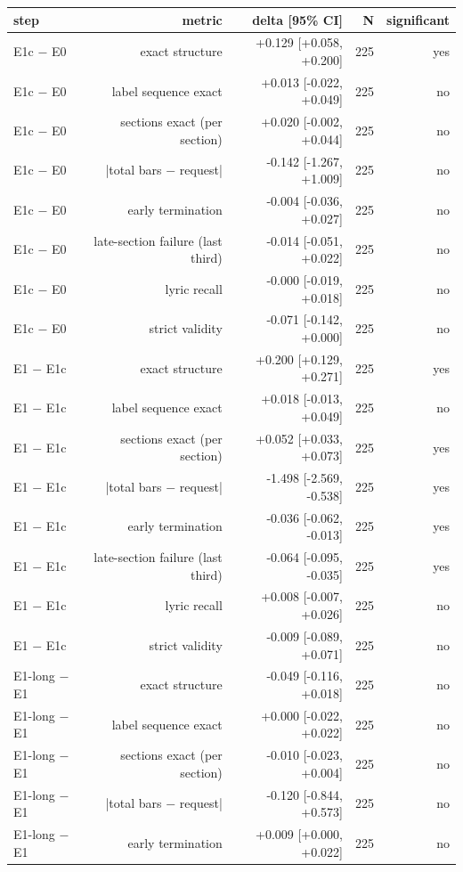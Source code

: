 \begin{table}[t]
\centering
\small
\begin{tabular}{lrrrr}
\toprule
step & metric & delta [95\% CI] & N & significant \\
\midrule
E1c $-$ E0 & exact structure & +0.129 [+0.058, +0.200] & 225 & yes \\
E1c $-$ E0 & label sequence exact & +0.013 [-0.022, +0.049] & 225 & no \\
E1c $-$ E0 & sections exact (per section) & +0.020 [-0.002, +0.044] & 225 & no \\
E1c $-$ E0 & |total bars $-$ request| & -0.142 [-1.267, +1.009] & 225 & no \\
E1c $-$ E0 & early termination & -0.004 [-0.036, +0.027] & 225 & no \\
E1c $-$ E0 & late-section failure (last third) & -0.014 [-0.051, +0.022] & 225 & no \\
E1c $-$ E0 & lyric recall & -0.000 [-0.019, +0.018] & 225 & no \\
E1c $-$ E0 & strict validity & -0.071 [-0.142, +0.000] & 225 & no \\
E1 $-$ E1c & exact structure & +0.200 [+0.129, +0.271] & 225 & yes \\
E1 $-$ E1c & label sequence exact & +0.018 [-0.013, +0.049] & 225 & no \\
E1 $-$ E1c & sections exact (per section) & +0.052 [+0.033, +0.073] & 225 & yes \\
E1 $-$ E1c & |total bars $-$ request| & -1.498 [-2.569, -0.538] & 225 & yes \\
E1 $-$ E1c & early termination & -0.036 [-0.062, -0.013] & 225 & yes \\
E1 $-$ E1c & late-section failure (last third) & -0.064 [-0.095, -0.035] & 225 & yes \\
E1 $-$ E1c & lyric recall & +0.008 [-0.007, +0.026] & 225 & no \\
E1 $-$ E1c & strict validity & -0.009 [-0.089, +0.071] & 225 & no \\
E1-long $-$ E1 & exact structure & -0.049 [-0.116, +0.018] & 225 & no \\
E1-long $-$ E1 & label sequence exact & +0.000 [-0.022, +0.022] & 225 & no \\
E1-long $-$ E1 & sections exact (per section) & -0.010 [-0.023, +0.004] & 225 & no \\
E1-long $-$ E1 & |total bars $-$ request| & -0.120 [-0.844, +0.573] & 225 & no \\
E1-long $-$ E1 & early termination & +0.009 [+0.000, +0.022] & 225 & no \\

\end{tabular}
\end{table}

